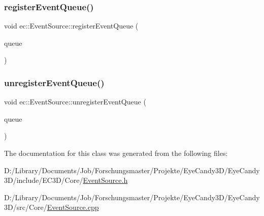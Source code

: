\mbox{\label{classec_1_1_event_source_a264c33075bc703f5b2b25d2d8b3fbd59}} 
\subsubsection{\texorpdfstring{register\+Event\+Queue()}{registerEventQueue()}}
{\footnotesize\ttfamily void ec\+::\+Event\+Source\+::register\+Event\+Queue (\begin{DoxyParamCaption}\item[{\mbox{\hyperlink{classec_1_1_event_queue}{Event\+Queue}} $\ast$}]{queue }\end{DoxyParamCaption})}

\mbox{\label{classec_1_1_event_source_a70bb21924f6d09e93921ad2cf5770413}} 
\subsubsection{\texorpdfstring{unregister\+Event\+Queue()}{unregisterEventQueue()}}
{\footnotesize\ttfamily void ec\+::\+Event\+Source\+::unregister\+Event\+Queue (\begin{DoxyParamCaption}\item[{\mbox{\hyperlink{classec_1_1_event_queue}{Event\+Queue}} $\ast$}]{queue }\end{DoxyParamCaption})}



The documentation for this class was generated from the following files\+:\begin{DoxyCompactItemize}
\item 
D\+:/\+Library/\+Documents/\+Job/\+Forschungsmaster/\+Projekte/\+Eye\+Candy3\+D/\+Eye\+Candy3\+D/include/\+E\+C3\+D/\+Core/\mbox{\hyperlink{_event_source_8h}{Event\+Source.\+h}}\item 
D\+:/\+Library/\+Documents/\+Job/\+Forschungsmaster/\+Projekte/\+Eye\+Candy3\+D/\+Eye\+Candy3\+D/src/\+Core/\mbox{\hyperlink{_event_source_8cpp}{Event\+Source.\+cpp}}\end{DoxyCompactItemize}
